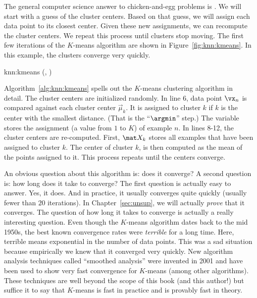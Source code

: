 The general computer science answer to chicken-and-egg problems is
.  We will start with a guess of the cluster
centers.  Based on that guess, we will assign each data point to its
closest center.  Given these new assignments, we can recompute the
cluster centers.  We repeat this process until clusters stop moving.
The first few iterations of the $K$-means algorithm are shown in
Figure~\ref{fig:knn:kmeans}.  In this example, the clusters converge
very quickly.

\newalgorithm%
  {knn:kmeans}%
  {(, )}
  {
 
\ENDFOR
\REPEAT
{}
\ENDFOR
{}
\ENDFOR
{}
\RETURN {} 
}

Algorithm~\ref{alg:knn:kmeans} spells out the $K$-means clustering
algorithm in detail.  The cluster centers are initialized randomly.
In line 6, data point $\vx_n$ is compared against each cluster center
$\vec\mu_k$.  It is assigned to cluster $k$ if $k$ is the center with
the smallest distance.  (That is the ``$\argmin$'' step.)  The
variable  stores the assignment (a value from $1$ to $K$)
of example $n$.  In lines 8-12, the cluster centers are re-computed.
First, $\mat X_k$ stores all examples that have been assigned to
cluster $k$.  The center of cluster $k$,  is then
computed as the mean of the points assigned to it.  This process
repeats until the centers converge.

An obvious question about this algorithm is: does it converge?  A
second question is: how long does it take to converge?  The first
question is actually easy to answer.  Yes, it does.  And in practice,
it usually converges quite quickly (usually fewer than $20$
iterations).  In Chapter~\ref{sec:unsup}, we will actually
\emph{prove} that it converges.  The question of how long it takes to
converge is actually a really interesting question.  Even though the
$K$-means algorithm dates back to the mid 1950s, the best known
convergence rates were \emph{terrible} for a long time.  Here,
terrible means exponential in the number of data points.  This was a
sad situation because empirically we knew that it converged very
quickly.  New algorithm analysis techniques called ``smoothed
analysis'' were invented in 2001 and have been used to show very fast
convergence for $K$-means (among other algorithms).  These techniques
are well beyond the scope of this book (and this author!) but suffice
it to say that $K$-means is fast in practice and is provably fast in
theory.

